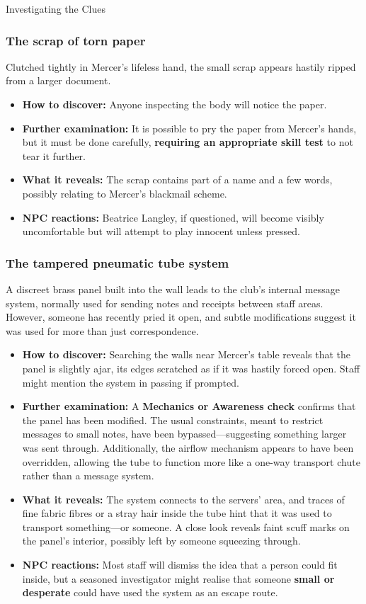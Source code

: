 \begin{WyrdComment}{Investigating the Clues}
	\subsubsection*{The scrap of torn paper}
	Clutched tightly in Mercer’s lifeless hand, the small scrap appears hastily ripped from a larger document.
	\begin{itemize}
		\item \textbf{How to discover:} Anyone inspecting the body will notice the paper.
		\item \textbf{Further examination:} It is possible to pry the paper from Mercer's hands, but it must be done carefully, \textbf{requiring an appropriate skill test} to not tear it further.
		\item \textbf{What it reveals:} The scrap contains part of a name and a few words, possibly relating to Mercer’s blackmail scheme.
		\item \textbf{NPC reactions:} Beatrice Langley, if questioned, will become visibly uncomfortable but will attempt to play innocent unless pressed.
	\end{itemize}
	
	\subsubsection*{The tampered pneumatic tube system}
	A discreet brass panel built into the wall leads to the club’s internal message system, normally used for sending notes and receipts between staff areas. However, someone has recently pried it open, and subtle modifications suggest it was used for more than just correspondence.

	\begin{itemize}
		\item \textbf{How to discover:} Searching the walls near Mercer’s table reveals that the panel is slightly ajar, its edges scratched as if it was hastily forced open. Staff might mention the system in passing if prompted.
		\item \textbf{Further examination:} A \textbf{Mechanics or Awareness check} confirms that the panel has been modified. The usual constraints, meant to restrict messages to small notes, have been bypassed—suggesting something larger was sent through. Additionally, the airflow mechanism appears to have been overridden, allowing the tube to function more like a one-way transport chute rather than a message system.
		\item \textbf{What it reveals:} The system connects to the servers’ area, and traces of fine fabric fibres or a stray hair inside the tube hint that it was used to transport something—or someone. A close look reveals faint scuff marks on the panel’s interior, possibly left by someone squeezing through.
		\item \textbf{NPC reactions:} Most staff will dismiss the idea that a person could fit inside, but a seasoned investigator might realise that someone \textbf{small or desperate} could have used the system as an escape route.
	\end{itemize}
\end{WyrdComment}



